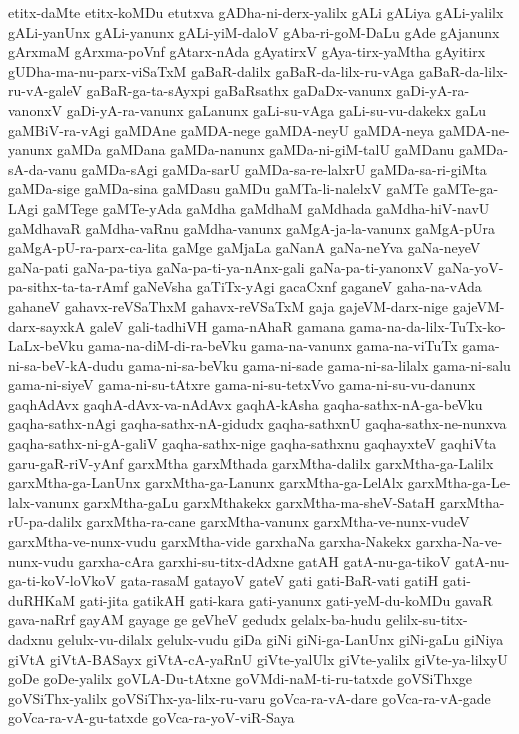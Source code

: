 {etitx-daMte
etitx-koMDu
etutxva
gADha-ni-derx-yalilx
gALi
gALiya
gALi-yalilx
gALi-yanUnx
gALi-yanunx
gALi-yiM-daloV
gAba-ri-goM-DaLu
gAde
gAjanunx
gArxmaM
gArxma-poVnf
gAtarx-nAda
gAyatirxV
gAya-tirx-yaMtha
gAyitirx
gUDha-ma-nu-parx-viSaTxM
gaBaR-dalilx
gaBaR-da-lilx-ru-vAga
gaBaR-da-lilx-ru-vA-galeV
gaBaR-ga-ta-sAyxpi
gaBaRsathx
gaDaDx-vanunx
gaDi-yA-ra-vanonxV
gaDi-yA-ra-vanunx
gaLanunx
gaLi-su-vAga
gaLi-su-vu-dakekx
gaLu
gaMBiV-ra-vAgi
gaMDAne
gaMDA-nege
gaMDA-neyU
gaMDA-neya
gaMDA-ne-yanunx
gaMDa
gaMDana
gaMDa-nanunx
gaMDa-ni-giM-talU
gaMDanu
gaMDa-sA-da-vanu
gaMDa-sAgi
gaMDa-sarU
gaMDa-sa-re-lalxrU
gaMDa-sa-ri-giMta
gaMDa-sige
gaMDa-sina
gaMDasu
gaMDu
gaMTa-li-nalelxV
gaMTe
gaMTe-ga-LAgi
gaMTege
gaMTe-yAda
gaMdha
gaMdhaM
gaMdhada
gaMdha-hiV-navU
gaMdhavaR
gaMdha-vaRnu
gaMdha-vanunx
gaMgA-ja-la-vanunx
gaMgA-pUra
gaMgA-pU-ra-parx-ca-lita
gaMge
gaMjaLa
gaNanA
gaNa-neYva
gaNa-neyeV
gaNa-pati
gaNa-pa-tiya
gaNa-pa-ti-ya-nAnx-gali
gaNa-pa-ti-yanonxV
gaNa-yoV-pa-sithx-ta-ta-rAmf
gaNeVsha
gaTiTx-yAgi
gacaCxnf
gaganeV
gaha-na-vAda
gahaneV
gahavx-reVSaThxM
gahavx-reVSaTxM
gaja
gajeVM-darx-nige
gajeVM-darx-sayxkA
galeV
gali-tadhiVH
gama-nAhaR
gamana
gama-na-da-lilx-TuTx-ko-LaLx-beVku
gama-na-diM-di-ra-beVku
gama-na-vanunx
gama-na-viTuTx
gama-ni-sa-beV-kA-dudu
gama-ni-sa-beVku
gama-ni-sade
gama-ni-sa-lilalx
gama-ni-salu
gama-ni-siyeV
gama-ni-su-tAtxre
gama-ni-su-tetxVvo
gama-ni-su-vu-danunx
gaqhAdAvx
gaqhA-dAvx-va-nAdAvx
gaqhA-kAsha
gaqha-sathx-nA-ga-beVku
gaqha-sathx-nAgi
gaqha-sathx-nA-gidudx
gaqha-sathxnU
gaqha-sathx-ne-nunxva
gaqha-sathx-ni-gA-galiV
gaqha-sathx-nige
gaqha-sathxnu
gaqhayxteV
gaqhiVta
garu-gaR-riV-yAnf
garxMtha
garxMthada
garxMtha-dalilx
garxMtha-ga-Lalilx
garxMtha-ga-LanUnx
garxMtha-ga-Lanunx
garxMtha-ga-LelAlx
garxMtha-ga-Le-lalx-vanunx
garxMtha-gaLu
garxMthakekx
garxMtha-ma-sheV-SataH
garxMtha-rU-pa-dalilx
garxMtha-ra-cane
garxMtha-vanunx
garxMtha-ve-nunx-vudeV
garxMtha-ve-nunx-vudu
garxMtha-vide
garxhaNa
garxha-Nakekx
garxha-Na-ve-nunx-vudu
garxha-cAra
garxhi-su-titx-dAdxne
gatAH
gatA-nu-ga-tikoV
gatA-nu-ga-ti-koV-loVkoV
gata-rasaM
gatayoV
gateV
gati
gati-BaR-vati
gatiH
gati-duRHKaM
gati-jita
gatikAH
gati-kara
gati-yanunx
gati-yeM-du-koMDu
gavaR
gava-naRrf
gayAM
gayage
ge
geVheV
gedudx
gelalx-ba-hudu
gelilx-su-titx-dadxnu
gelulx-vu-dilalx
gelulx-vudu
giDa
giNi
giNi-ga-LanUnx
giNi-gaLu
giNiya
giVtA
giVtA-BASayx
giVtA-cA-yaRnU
giVte-yalUlx
giVte-yalilx
giVte-ya-lilxyU
goDe
goDe-yalilx
goVLA-Du-tAtxne
goVMdi-naM-ti-ru-tatxde
goVSiThxge
goVSiThx-yalilx
goVSiThx-ya-lilx-ru-varu
goVca-ra-vA-dare
goVca-ra-vA-gade
goVca-ra-vA-gu-tatxde
goVca-ra-yoV-viR-Saya
}
